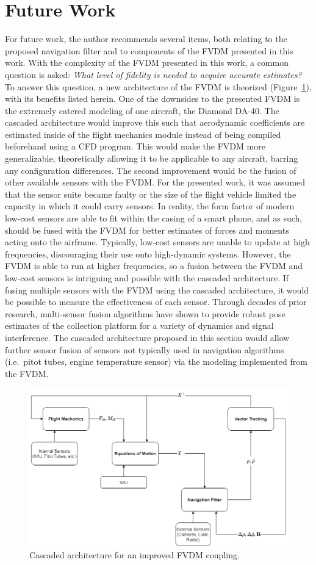 \section{\textbf{Future Work}}
For future work, the author recommends several items, both relating to the proposed navigation filter and to components of the FVDM presented in this work. With the complexity of the FVDM presented in this work, a common question is asked: \textit{What level of fidelity is needed to acquire accurate estimates?} To answer this question, a new architecture of the FVDM is theorized (Figure~\ref{fig:futurework}), with its benefits listed herein. One of the downsides to the presented FVDM is the extremely catered modeling of one aircraft, the Diamond DA-40. The cascaded architecture would improve this such that aerodynamic coefficients are estimated inside of the flight mechanics module instead of being compiled beforehand using a CFD program. This would make the FVDM more generalizable, theoretically allowing it to be applicable to any aircraft, barring any configuration differences. The second improvement would be the fusion of other available sensors with the FVDM\@. For the presented work, it was assumed that the sensor suite became faulty or the size of the flight vehicle limited the capacity in which it could carry sensors. In reality, the form factor of modern low-cost sensors are able to fit within the casing of a smart phone, and as such, should be fused with the FVDM for better estimates of forces and moments acting onto the airframe. Typically, low-cost sensors are unable to update at high frequencies, discouraging their use onto high-dynamic systems. However, the FVDM is able to run at higher frequencies, so a fusion between the FVDM and low-cost sensors is intriguing and possible with the cascaded architecture. If fusing multiple sensors with the FVDM using the cascaded architecture, it would be possible to measure the effectiveness of each sensor. Through decades of prior research, multi-sensor fusion algorithms have shown to provide robust pose estimates of the collection platform for a variety of dynamics and signal interference. The cascaded architecture proposed in this section would allow further sensor fusion of sensors not typically used in navigation algorithms (i.e.\ pitot tubes, engine temperature sensor) via the modeling implemented from the FVDM\@.

\begin{figure}[!ht]
    \centering
    \includegraphics[width=\linewidth]{Figures/futurework.drawio.png}
    \caption{Cascaded architecture for an improved FVDM coupling.}\label{fig:futurework}
\end{figure}

